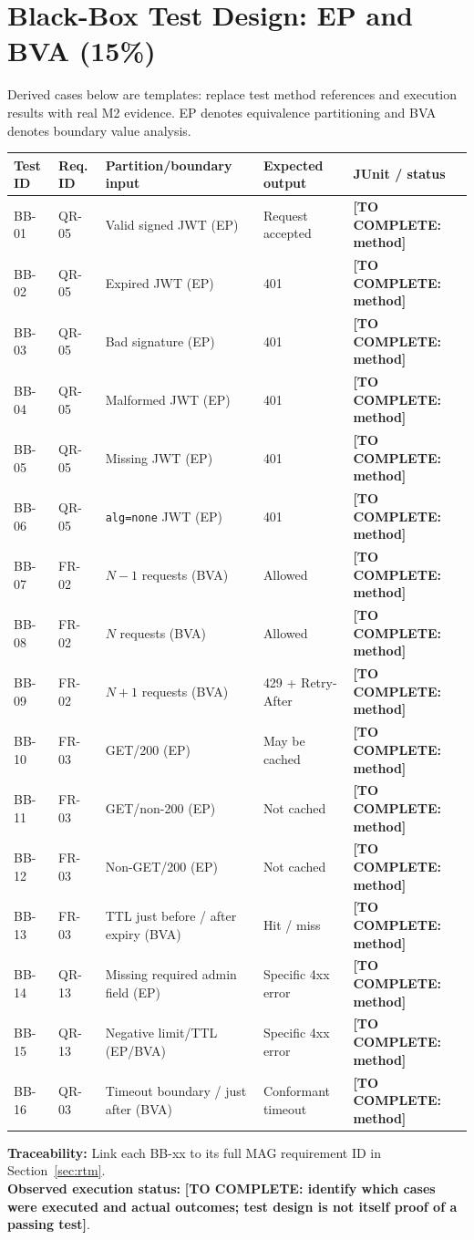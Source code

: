 \documentclass[11pt,a4paper]{article}
\newcommand{\todo}[1]{\textcolor{red!70!black}{\textbf{[TO COMPLETE: #1]}}}
\begin{document}
\section{Black-Box Test Design: EP and BVA (15\%)}\label{sec:blackbox}
Derived cases below are templates: replace test method references and execution results with real M2 evidence. EP denotes equivalence partitioning and BVA denotes boundary value analysis.
\begin{longtable}{L{1.4cm} L{1.8cm} L{4.1cm} L{3.4cm} L{2.3cm}}\toprule
\textbf{Test ID} & \textbf{Req. ID} & \textbf{Partition/boundary input} & \textbf{Expected output} & \textbf{JUnit / status}\\\midrule\endhead
BB-01 & QR-05 & Valid signed JWT (EP) & Request accepted & \todo{method}\\
BB-02 & QR-05 & Expired JWT (EP) & 401 & \todo{method}\\
BB-03 & QR-05 & Bad signature (EP) & 401 & \todo{method}\\
BB-04 & QR-05 & Malformed JWT (EP) & 401 & \todo{method}\\
BB-05 & QR-05 & Missing JWT (EP) & 401 & \todo{method}\\
BB-06 & QR-05 & \texttt{alg=none} JWT (EP) & 401 & \todo{method}\\
BB-07 & FR-02 & $N-1$ requests (BVA) & Allowed & \todo{method}\\
BB-08 & FR-02 & $N$ requests (BVA) & Allowed & \todo{method}\\
BB-09 & FR-02 & $N+1$ requests (BVA) & 429 + Retry-After & \todo{method}\\
BB-10 & FR-03 & GET/200 (EP) & May be cached & \todo{method}\\
BB-11 & FR-03 & GET/non-200 (EP) & Not cached & \todo{method}\\
BB-12 & FR-03 & Non-GET/200 (EP) & Not cached & \todo{method}\\
BB-13 & FR-03 & TTL just before / after expiry (BVA) & Hit / miss & \todo{method}\\
BB-14 & QR-13 & Missing required admin field (EP) & Specific 4xx error & \todo{method}\\
BB-15 & QR-13 & Negative limit/TTL (EP/BVA) & Specific 4xx error & \todo{method}\\
BB-16 & QR-03 & Timeout boundary / just after (BVA) & Conformant timeout & \todo{method}\\\bottomrule\end{longtable}
\textbf{Traceability:} Link each BB-xx to its full MAG requirement ID in Section~\ref{sec:rtm}. \\ \textbf{Observed execution status:} \todo{identify which cases were executed and actual outcomes; test design is not itself proof of a passing test}.
\end{document}
